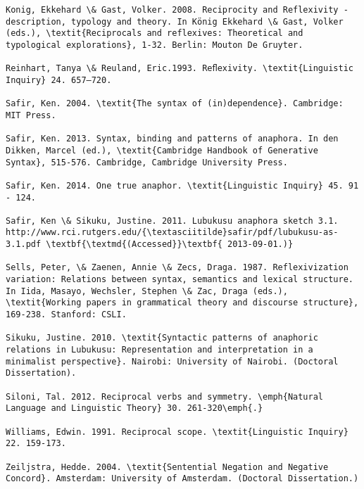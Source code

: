 \documentclass[output=paper]{langsci/langscibook}
\begin{document}
\begin{verbatim}
Konig, Ekkehard \& Gast, Volker. 2008. Reciprocity and Reflexivity - description, typology and theory. In König Ekkehard \& Gast, Volker (eds.), \textit{Reciprocals and reflexives: Theoretical and typological explorations}, 1-32. Berlin: Mouton De Gruyter.

Reinhart, Tanya \& Reuland, Eric.1993. Reﬂexivity. \textit{Linguistic Inquiry} 24. 657–720.

Safir, Ken. 2004. \textit{The syntax of (in)dependence}. Cambridge: MIT Press.

Safir, Ken. 2013. Syntax, binding and patterns of anaphora. In den Dikken, Marcel (ed.), \textit{Cambridge Handbook of Generative Syntax}, 515-576. Cambridge, Cambridge University Press.

Safir, Ken. 2014. One true anaphor. \textit{Linguistic Inquiry} 45. 91 - 124.

Safir, Ken \& Sikuku, Justine. 2011. Lubukusu anaphora sketch 3.1. http://www.rci.rutgers.edu/{\textasciitilde}safir/pdf/lubukusu-as-3.1.pdf \textbf{\textmd{(Accessed}}\textbf{ 2013-09-01.)}

Sells, Peter, \& Zaenen, Annie \& Zecs, Draga. 1987. Reflexivization variation: Relations between syntax, semantics and lexical structure. In Iida, Masayo, Wechsler, Stephen \& Zac, Draga (eds.), \textit{Working papers in grammatical theory and discourse structure}, 169-238. Stanford: CSLI. 

Sikuku, Justine. 2010. \textit{Syntactic patterns of anaphoric relations in Lubukusu: Representation and interpretation in a minimalist perspective}. Nairobi: University of Nairobi. (Doctoral Dissertation).

Siloni, Tal. 2012. Reciprocal verbs and symmetry. \emph{Natural Language and Linguistic Theory} 30. 261-320\emph{.}

Williams, Edwin. 1991. Reciprocal scope. \textit{Linguistic Inquiry} 22. 159-173.

Zeiljstra, Hedde. 2004. \textit{Sentential Negation and Negative Concord}. Amsterdam: University of Amsterdam. (Doctoral Dissertation.)


\end{verbatim}
 

\printbibliography[heading=subbibliography,notkeyword=this]
\end{document}
